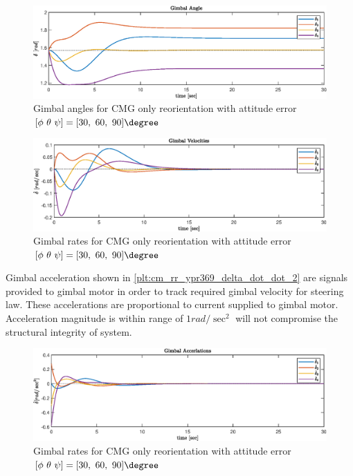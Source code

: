 \begin{figure}[H]
     \centering
    \includegraphics[width=0.9\columnwidth]{figures/plots/CMG/cm_rr_ypr369_delta.eps}
    \caption{Gimbal angles for CMG only reorientation with attitude error $\displaystyle [\phi\ \theta\ \psi] =[30,\ 60,\ 90]\degree $}
    \label{plt:cm_rr_ypr369_delta_2}
\end{figure}

\begin{figure}[H]
     \centering
    \includegraphics[width=0.9\columnwidth]{figures/plots/CMG/cm_rr_ypr369_delta_dot.eps}
    \caption{Gimbal rates for CMG only reorientation with attitude error $\displaystyle [\phi\ \theta\ \psi] =[30,\ 60,\ 90]\degree $}
    \label{plt:cm_rr_ypr369_delta_dot_2}
\end{figure}
\noindent Gimbal acceleration shown in \autoref{plt:cm_rr_ypr369_delta_dot_dot_2} are signals provided to gimbal motor in order to track required gimbal velocity for steering law. These accelerations are proportional to current supplied to gimbal motor. Acceleration magnitude is within range of $1 rad/\sec^2$ will not compromise the structural integrity of system.

\begin{figure}[H]
     \centering
    \includegraphics[width=0.9\columnwidth]{figures/plots/CMG/cm_rr_ypr369_delta_dot_dot.eps}
    \caption{Gimbal rates for CMG only reorientation with attitude error $\displaystyle [\phi\ \theta\ \psi] =[30,\ 60,\ 90]\degree $}
    \label{plt:cm_rr_ypr369_delta_dot_dot_2}
\end{figure}

